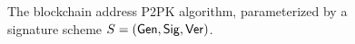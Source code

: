 \begin{figure}[t]
\begin{algorithm}[H]
    \caption{\label{alg.p2pk} The blockchain address P2PK algorithm,
    parameterized by a signature scheme $S = (\mathsf{Gen}, \mathsf{Sig}, \mathsf{Ver})$.}
    \begin{algorithmic}[1]
            \State{}
        \EndFunction
            \State{}
        \EndFunction
        \vskip8pt
    \end{algorithmic}
\end{algorithm}
\end{figure}
